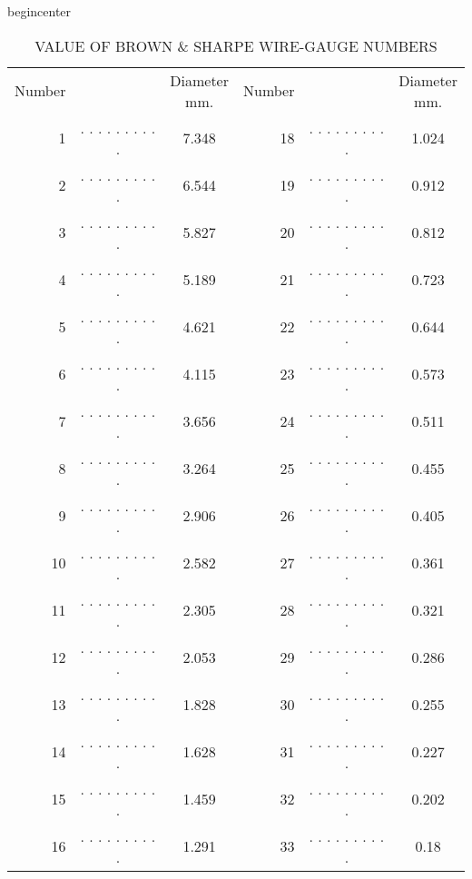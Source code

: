 begin{center}

\begin{table}[h!]
 
    \caption{\textsc{VALUE OF BROWN \& SHARPE WIRE-GAUGE NUMBERS}}
    \bgroup
    \def\arraystretch{1}%
        \begin{tabular}{rcc|rcc}
            \small{Number} & & \makecell{ \small{Diameter} \\ \small{mm.} } & \small{Number} & & \makecell{ \small{Diameter} \\ \small{mm.} } \\
            1 &  . . . . . . . . . . & 7.348 & 18 &  . . . . . . . . . . & 1.024 \\
            2 &  . . . . . . . . . . & 6.544 & 19 &  . . . . . . . . . . & 0.912 \\
            3 &  . . . . . . . . . . & 5.827 & 20 &  . . . . . . . . . . & 0.812 \\
            4 &  . . . . . . . . . . & 5.189 & 21 &  . . . . . . . . . . & 0.723 \\
            5 &  . . . . . . . . . . & 4.621 & 22 &  . . . . . . . . . . & 0.644 \\
            6 &  . . . . . . . . . . & 4.115 & 23 &  . . . . . . . . . . & 0.573 \\
            7 &  . . . . . . . . . . & 3.656 & 24 &  . . . . . . . . . . & 0.511 \\
            8 &  . . . . . . . . . . & 3.264 & 25 &  . . . . . . . . . . & 0.455 \\
            9 &  . . . . . . . . . . & 2.906 & 26 &  . . . . . . . . . . & 0.405 \\
            10 &  . . . . . . . . . . & 2.582 & 27 &  . . . . . . . . . . & 0.361 \\
            11 &  . . . . . . . . . . & 2.305 & 28 &  . . . . . . . . . . & 0.321 \\
            12 &  . . . . . . . . . . & 2.053 & 29 &  . . . . . . . . . . & 0.286 \\
            13 &  . . . . . . . . . . & 1.828 & 30 &  . . . . . . . . . . & 0.255 \\
            14 &  . . . . . . . . . . & 1.628 & 31 &  . . . . . . . . . . & 0.227 \\
            15 &  . . . . . . . . . . & 1.459 & 32 &  . . . . . . . . . . & 0.202 \\
            16 &  . . . . . . . . . . & 1.291 & 33 &  . . . . . . . . . . & 0.18 \\
        \end{tabular}
    \egroup

\end{table}
 
